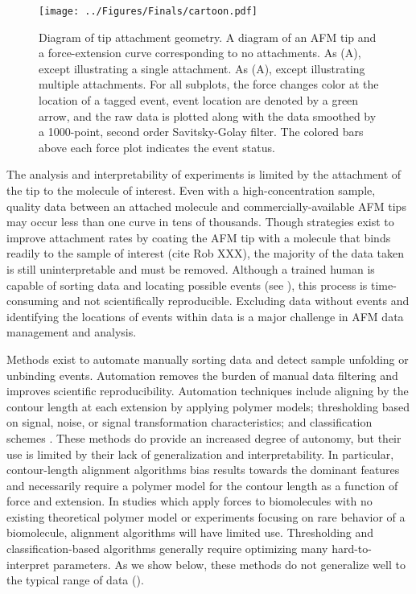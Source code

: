 \begin{figure}[htpb]
\caption[Diagram of AFM attachment geometry]{Diagram of tip attachment geometry.  A diagram of an AFM tip and a force-extension curve corresponding to no attachments.  As (A), except illustrating a single attachment.  As (A), except illustrating multiple attachments. For all subplots, the force changes color at the location of a tagged event, event location are denoted by a green arrow, and the raw data is plotted along with the data smoothed by a 1000-point, second order Savitsky-Golay filter. The colored bars above each force plot indicates the event status.}
\centering
\texttt{[image: ../Figures/Finals/cartoon.pdf]}%
\end{figure}
The analysis and interpretability of \singlemol{} experiments is limited by the attachment of the tip to the molecule of interest. Even with a high-concentration sample, quality \singlemol{} data between an attached molecule and commercially-available AFM tips may occur less than one curve in tens of thousands. Though strategies exist to improve attachment rates by coating the AFM tip with a molecule that binds readily to the sample of interest (cite Rob XXX), the majority of the data taken is still uninterpretable and must be removed. Although a trained human is capable of sorting \singlemol{} data and locating possible events (see ), this process is time-consuming and not scientifically reproducible. Excluding data without events and identifying the locations of events within data is a major challenge in AFM data management and analysis.

Methods exist to automate manually sorting \singlemol{} data and detect sample unfolding or unbinding events. Automation removes the burden of manual data filtering and improves scientific reproducibility. Automation techniques include aligning by the contour length at each extension by applying polymer models; thresholding based on signal, noise, or signal transformation characteristics; and classification schemes . These methods do provide an increased degree of autonomy, but their use is limited by their lack of generalization and interpretability. In particular, contour-length alignment algorithms bias results towards the dominant features and necessarily require a polymer model for the contour length as a function of force and extension. In \singlemol{} studies which apply forces to biomolecules with no existing theoretical polymer model or experiments focusing on rare behavior of a biomolecule, alignment algorithms will have limited use.  Thresholding and classification-based algorithms generally require optimizing many hard-to-interpret parameters. As we show below, these methods do not generalize well to the typical range of \singlemol{} data ().

